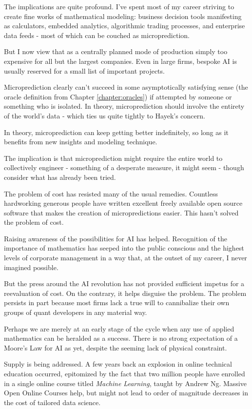 The implications are quite profound. I've spent most of my career striving to create fine works of mathematical modeling: business decision tools manifesting as calculators, embedded analytics, algorithmic trading processes, and enterprise data feeds - most of which can be couched as microprediction. 


But I now view that as a centrally planned mode of production simply too expensive for all but the largest companies. Even in large firms, bespoke AI is usually reserved for a small list of important projects. 


Microprediction clearly can't succeed in some asymptotically satisfying sense (the oracle definition from Chapter \ref{chapter:oracles}) if attempted by someone or something who is isolated. In theory, microprediction should involve the entirety of the world's data - which ties us quite tightly to Hayek's concern. 


In theory, microprediction can keep getting better indefinitely, so long as it benefits from new insights and modeling technique. 
 
 
The implication is that microprediction might require the entire world to collectively engineer - something of a desperate measure, it might seem - though consider what has already been tried. 


The problem of cost has resisted many of the usual remedies. Countless hardworking generous people have written excellent freely available open source software that makes the creation of micropredictions easier. This hasn't solved the problem of cost. 

Raising awareness of the possibilities for AI has helped. Recognition of the importance of mathematics has seeped into the public conscious and the highest levels of corporate management in a way that, at the outset of my career, I never imagined possible. 

But the press around the AI revolution has not provided sufficient impetus for a reevaluation of cost. On the contrary, it helps disguise the problem. The problem persists in part because most firms lack a true will to cannibalize their own groups of quant developers in any material way.


Perhaps we are merely at an early stage of the cycle when any use of applied mathematics can be heralded as a success. There is no strong expectation of a Moore's Law for AI as yet, despite the seeming lack of physical constraint.  


Supply is being addressed. A few years back an explosion in online technical education occurred, epitomized by the fact that two million people have enrolled in a single online course titled {\em Machine Learning}, taught by Andrew Ng. Massive Open Online Courses help, but might not lead to order of magnitude decreases in the cost of tailored data science.  

